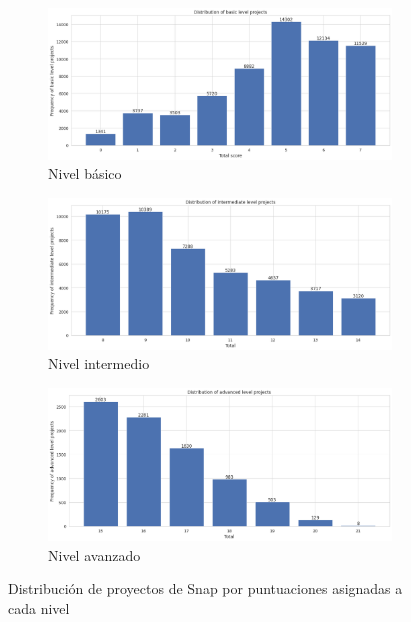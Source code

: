 \documentclass[a4paper, 12pt]{book}
\begin{document}
\begin{figure}[H]
    \centering
    \begin{subfigure}[h]{.7\textwidth} 
        \includegraphics[width=\textwidth]{img/basic_Snap}
        \caption{Nivel básico}
        \label{fig:basic_Snap}
    \end{subfigure}       
    \begin{subfigure}[h]{.7\textwidth} 
        \includegraphics[width=\textwidth]{img/intermediate_Snap}
        \caption{Nivel intermedio}
        \label{fig:intermediate}
    \end{subfigure}
    \begin{subfigure}[h]{.7\textwidth} 
        \includegraphics[width=\textwidth]{img/advanced_Snap}
        \caption{Nivel avanzado}
        \label{fig:advanced}
    \end{subfigure}
    \caption{Distribución de proyectos de Snap por puntuaciones asignadas a cada nivel}
\end{figure}
\end{document}
